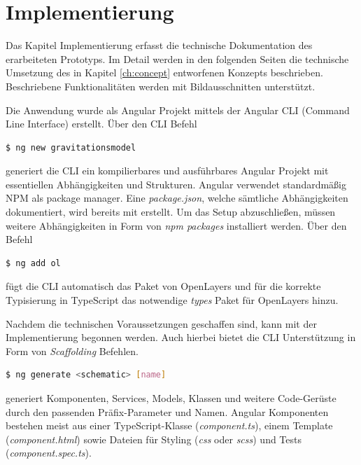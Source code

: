 \chapter{Implementierung}
\label{ch:implementierung}
Das Kapitel Implementierung erfasst die technische Dokumentation des erarbeiteten Prototyps.
Im Detail werden in den folgenden Seiten die technische Umsetzung des in Kapitel \ref{ch:concept} entworfenen Konzepts beschrieben. 
Beschriebene Funktionalitäten werden mit Bildausschnitten unterstützt.

Die Anwendung wurde als Angular Projekt mittels der Angular CLI (Command Line Interface) erstellt. 
Über den CLI Befehl 

\begin{lstlisting}[language=bash, caption={Erstellen eines neuen Projektes}]
$ ng new gravitationsmodel
\end{lstlisting}

generiert die CLI ein kompilierbares und ausführbares Angular Projekt mit essentiellen Abhängigkeiten und Strukturen.
Angular verwendet standardmäßig NPM als package manager.
Eine \emph{package.json}, welche sämtliche Abhängigkeiten dokumentiert, wird bereits mit erstellt.
Um das Setup abzuschließen, müssen weitere Abhängigkeiten in Form von \emph{npm packages} installiert werden.
Über den Befehl 

\begin{lstlisting}[language=bash, caption={Hinzufügen des OpenLayers Pakets}]
$ ng add ol
\end{lstlisting}

fügt die CLI automatisch das Paket von OpenLayers und für die korrekte Typisierung in TypeScript das notwendige \emph{types} Paket für OpenLayers hinzu.

Nachdem die technischen Voraussetzungen geschaffen sind, kann mit der Implementierung begonnen werden.
Auch hierbei bietet die CLI Unterstützung in Form von \emph{Scaffolding} Befehlen.

\begin{lstlisting}[language=bash, caption={Angular schematic Befehl zum Erstellen}]
$ ng generate <schematic> [name]
\end{lstlisting}

generiert Komponenten, Services, Models, Klassen und weitere Code-Gerüste durch den passenden Präfix-Parameter und Namen.
Angular Komponenten bestehen meist aus einer TypeScript-Klasse (\emph{component.ts}), einem Template (\emph{component.html}) sowie Dateien für Styling (\emph{css} oder \emph{scss}) und Tests (\emph{component.spec.ts}).


